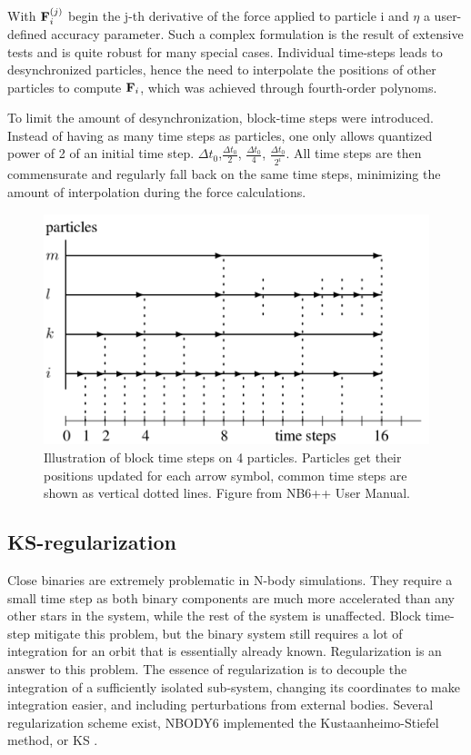 With $\bold{F}^{(j)}_i$ begin the j-th derivative of the force applied to particle i and $\eta$ a user-defined accuracy parameter. Such a complex formulation is the result of extensive tests and is quite robust for many special cases. Individual time-steps leads to desynchronized particles, hence the need to interpolate the positions of other particles to compute $\bold{F}_i$, which was achieved through fourth-order polynoms.
 
 To limit the amount of desynchronization, block-time steps were introduced. Instead of having as many time steps as particles, one only allows quantized power of 2 of an initial time step. $\Delta t_0$,$\frac{\Delta t_0}{2}$, $\frac{\Delta t_0}{4}$, $\frac{\Delta t_0}{2^i}$. All time steps are then commensurate and regularly fall back on the same time steps, minimizing the amount of interpolation during the force calculations.
 
\begin{figure}
\label{Fig:blocktimesteps}
\center
\includegraphics[width=0.6\linewidth]{Figures/0_block_timesteps.png}
\caption{Illustration of block time steps on 4 particles. Particles get their positions updated for each arrow symbol, common time steps are shown as vertical dotted lines. Figure from NB6++ User Manual. }
\end{figure} 
 
 
\subsection{KS-regularization}

Close binaries are extremely problematic in N-body simulations. They require a small time step as both binary components are much more accelerated than any other stars in the system, while the rest of the system is unaffected. Block time-step mitigate this problem, but the binary system still requires a lot of integration for an orbit that is essentially already known. Regularization is an answer to this problem. The essence of regularization is to decouple the integration of a sufficiently isolated sub-system, changing its coordinates to make integration easier, and including perturbations from external bodies. Several regularization scheme exist, NBODY6 implemented the Kustaanheimo-Stiefel method, or KS \citep{KS1965}.

